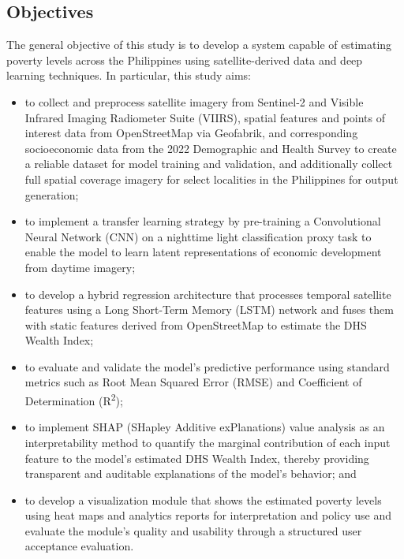 \documentclass[12pt, letterpaper]{article}
\numberwithin{figure}{section}
\numberwithin{table}{section}
\begin{document}
\subsection{Objectives}
The general objective of this study is to develop a system capable of
estimating poverty levels across the Philippines using
satellite-derived data and deep learning techniques. In particular,
this study aims:
\begin{itemize}
  \item to collect and preprocess satellite imagery from Sentinel-2 and
    Visible Infrared Imaging Radiometer Suite (VIIRS), spatial
    features and points of interest data from OpenStreetMap via
    Geofabrik, and corresponding socioeconomic data from the 2022
    Demographic and Health Survey to create a reliable dataset for
    model training and validation, and additionally collect full
    spatial coverage imagery for select localities in the Philippines
    for output generation;
  \item to implement a transfer learning strategy by pre-training a
    Convolutional Neural Network (CNN) on a nighttime light
    classification proxy task to enable the model to learn latent
    representations of economic development from daytime imagery;
  \item to develop a hybrid regression architecture that processes
    temporal satellite features using a Long Short-Term Memory (LSTM)
    network and fuses them with static features derived from OpenStreetMap to
    estimate the DHS Wealth Index;
  \item to evaluate and validate the model's predictive performance
    using standard metrics such as Root Mean Squared Error (RMSE) and
    Coefficient of Determination (R\textsuperscript{2});
  \item to implement SHAP (SHapley Additive exPlanations) value analysis
    as an interpretability method to quantify the marginal
    contribution of each input feature to the model's estimated DHS
    Wealth Index, thereby providing transparent and auditable
    explanations of the model's behavior; and
  \item to develop a visualization module that shows the estimated
    poverty levels using heat
    maps and analytics reports for interpretation and policy use and
    evaluate the module's quality and usability through a structured
    user acceptance evaluation.
\end{itemize}
\end{document}
